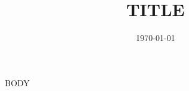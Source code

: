 \documentclass{article}
\title{{{TITLE}}}
\date{\today}
\begin{document}
\maketitle

{{BODY}}
\end{document}
